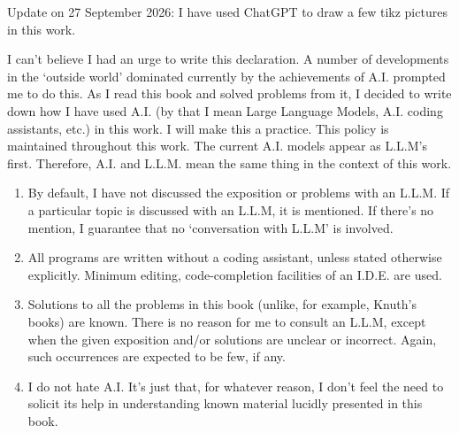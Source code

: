 \documentclass[11pt]{book}
\theoremstyle{definition}
\theoremstyle{plain}
\theoremstyle{definition}
\theoremstyle{problemstyle}
\theoremstyle{remark}
\theoremstyle{definition}
\begin{document}
\begin{mybox}
    Update on 27 September 2026: I have used ChatGPT to draw a few tikz pictures in this work.

    I can't believe I had an urge to write this declaration. A number of developments in the `outside world' dominated currently by the achievements of A.I. prompted me to do this. As I read this book and solved problems from it, I decided to write down how I have used A.I. (by that I mean Large Language Models, A.I. coding assistants, etc.) in this work. I will make this a practice. This policy is maintained throughout this work. The current A.I. models appear as L.L.M's first. Therefore, A.I. and L.L.M. mean the same thing in the context of this work.
    \begin{enumerate}
        \item By default, I have not discussed the exposition or problems with an L.L.M. If a particular topic is discussed with an L.L.M, it is mentioned. If there's no mention, I guarantee that no `conversation with L.L.M' is involved.
        \item All programs are written without a coding assistant, unless stated otherwise explicitly. Minimum editing, code-completion facilities of an I.D.E. are used.
        \item Solutions to all the problems in this book (unlike, for example, Knuth's books) are known. There is no reason for me to consult an L.L.M, except when the given exposition and/or solutions are unclear or incorrect. Again, such occurrences are expected to be few, if any.
        \item I do not hate A.I. It's just that, for whatever reason, I don't feel the need to solicit its help in understanding known material lucidly presented in this book.
    \end{enumerate}
    \label{box:aipolicy}
\end{mybox}
\newpage
\end{document}
